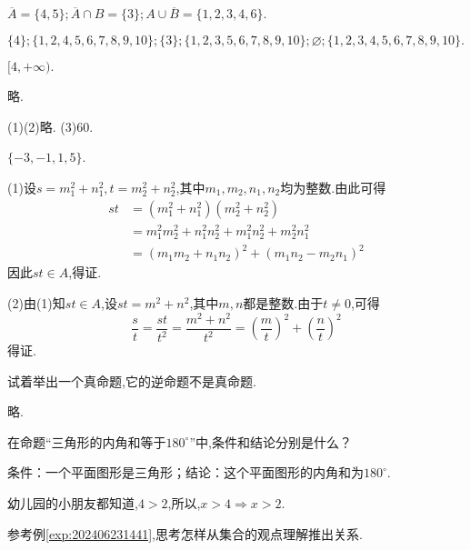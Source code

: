 \documentclass[lang=cn,newtx,10pt,scheme=chinese]{elegantbook}
\begin{document}
\begin{exercise}
  $\overline{A}=\{4,5\};\overline{A}\cap B=\{3\};A\cup\overline{B}=\{1,2,3,4,6\}.$
\end{exercise}
\begin{exercise}
  $\{4\};\{1,2,4,5,6,7,8,9,10\};\{3\};\{1,2,3,5,6,7,8,9,10\};\varnothing ;\{1,2,3,4,5,6,7,8,9,10\}.$
\end{exercise}
\begin{exercise}
  $[4,+\infty).$
\end{exercise}
\begin{exercise}
  略.
\end{exercise}
\begin{exercise}
  (1)(2)略.
  (3)60.
\end{exercise}
\begin{exercise}
  $\{-3,-1,1,5\}$.
\end{exercise}
\begin{exercise}
  (1)设$s=m_1^2+n_1^2,t=m_2^2+n_2^2$,其中$m_1,m_2,n_1,n_2$均为整数.由此可得
  $$\begin{aligned}
    st& =(m_1^2+n_1^2)(m_2^2+n_2^2)  \\
    &=m_1^2m_2^2+n_1^2n_2^2+m_1^2n_2^2+m_2^2n_1^2 \\
    &=(m_1m_2+n_1n_2)^2+(m_1n_2-m_2n_1)^2
    \end{aligned}$$
  因此$st\in A$,得证.
  
  (2)由(1)知$st \in A$,设$st=m^2+n^2$,其中$m,n$都是整数.由于$t\neq 0$,可得$$\frac st=\frac{st}{t^2}=\frac{m^2+n^2}{t^2}=\left(\frac mt\right)^2+\left(\frac nt\right)^2$$
  得证.
\end{exercise}
\begin{exercise}\label{exer:202405021028}
  试着举出一个真命题,它的逆命题不是真命题.
\end{exercise}
\begin{solution}
  略.
\end{solution}
\begin{exercise}
  在命题“三角形的内角和等于$180^{\circ}$”中,条件和结论分别是什么？
\end{exercise}
\begin{solution}
  条件：一个平面图形是三角形；结论：这个平面图形的内角和为$180^{\circ}$.
\end{solution}
\begin{example}\label{exp:202406231441}
  幼儿园的小朋友都知道,$4>2$,所以,$x>4\Rightarrow x>2$.
\end{example}
\begin{problem}\label{202406262000}
  参考例\ref{exp:202406231441},思考怎样从集合的观点理解推出关系.
\end{problem}
\end{document}
